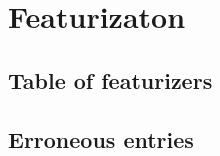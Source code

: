 %

\chapter{Featurizaton}

\section{Table of featurizers}


\newpage

\section{Erroneous entries}



\clearpage

